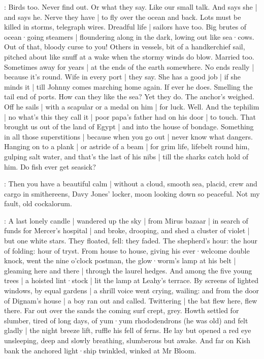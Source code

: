 \BloomAbstract:
Birds too.
Never find out.
Or what they say.
Like our small talk.
And says she |
and says he.
Nerve they have |
to fly over the ocean
and back.
Lots must be killed in storms,
telegraph wires.
Dreadful life |
sailors have too.
Big brutes of ocean·going steamers |
floundering along in the dark,
lowing out like sea·cows.
Out of that,
bloody curse to you!%
Others in vessels,
bit of a handkerchief sail,
pitched about like snuff at a wake
when the stormy winds do blow.
Married too.
Sometimes away for years |
at the ends of the earth somewhere.
No ends really |
because it's round.
Wife in every port |
they say.
She has a good job |
if she minds it |
till Johnny comes marching home again.
If ever he does.
Smelling the tail end of ports.
How can they like the sea?
Yet they do.
The anchor's weighed.
Off he sails |
with a scapular or a medal on him |
for luck.
Well.
And the tephilim |
no what's this they call it |
poor papa's father had on his door |
to touch.
That brought us out of the land of Egypt |
and into the house of bondage.
Something in all those superstitions |
because when you go out |
never know what dangers.%
Hanging on to a plank |
or astride of a beam |
for grim life,
lifebelt round him,
gulping salt water,
and that's the last of his nibs |
till the sharks catch hold of him.
Do fish ever get seasick?

\BloomAbstract:
Then you have a beautiful calm |
without a cloud,
smooth sea,
placid,
crew and cargo in smithereens,
Davy Jones' locker,
moon looking down so peaceful.
Not my fault,
old cockalorum.

\Nnovel:
A last lonely candle |
wandered up the sky |
from Mirus bazaar |
in search of funds for Mercer's hospital |
and broke,
drooping,
and shed a cluster of violet |
but one white stars.
They floated,
fell:
they faded.
The shepherd's hour:
the hour of folding:
hour of tryst.
From house to house,
giving his ever·welcome double knock,%
went the nine o'clock postman,
the glow·worm's lamp at his belt |
gleaming here and there |
through the laurel hedges.
And among the five young trees |
a hoisted lint·stock |
lit the lamp at Leahy's terrace.
By screens of lighted windows,
by equal gardens |
a shrill voice went crying,
wailing:
and from the door of Dignam's house |
a boy ran out and called.
Twittering |
the bat flew here,
flew there.
Far out over the sands
the coming surf crept,
grey.
Howth settled for slumber,
tired of long days,
of yum·yum rhododendrons
(he was old)
and felt gladly |
the night breeze lift,
ruffle his fell of ferns.
He lay
but opened a red eye
unsleeping,
deep and slowly breathing,
slumberous but awake.%
And far on Kish bank
the anchored light·ship twinkled,
winked at Mr Bloom.

